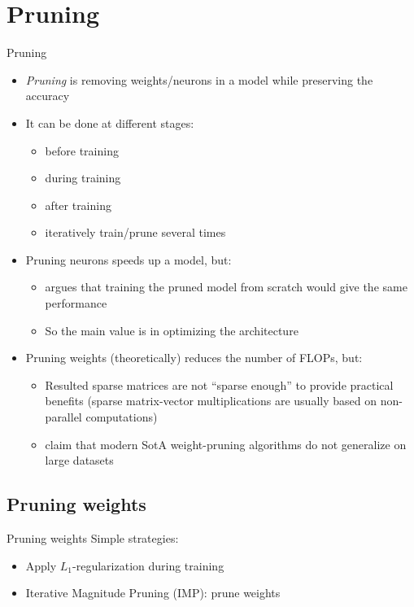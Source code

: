 \documentclass[10pt, handout]{beamer}
\begin{document}
\section{Pruning}
\begin{frame}{Pruning}
    \begin{itemize}
        \item\pause \textit{Pruning} is removing weights/neurons in a model while preserving the accuracy
        \item\pause It can be done at different stages:
        \begin{itemize}
            \item\pause before training
            \item\pause during training
            \item\pause after training
            \item\pause iteratively train/prune several times
        \end{itemize}
        \item\pause Pruning neurons speeds up a model, but:
        \begin{itemize}
            \item\pause \cite{Rethinking_Pruning} argues that training the pruned model from scratch would give the same performance
            \item\pause So the main value is in optimizing the architecture
        \end{itemize}
        \item\pause Pruning weights (theoretically) reduces the number of FLOPs, but:
        \begin{itemize}
            \item\pause Resulted sparse matrices are not ``sparse enough'' to provide practical benefits (sparse matrix-vector multiplications are usually based on non-parallel computations)
            \item\pause \cite{State_of_sparsity, Rethinking_Pruning} claim that modern SotA weight-pruning algorithms do  not generalize on large datasets
        \end{itemize}
    \end{itemize}
\end{frame}


\subsection{Pruning weights}
\begin{frame}{Pruning weights}
    \pause Simple strategies:
    \begin{itemize}
        \item Apply $L_1$-regularization during training
        \item Iterative Magnitude Pruning (IMP): prune weights
    \end{itemize}
\end{frame}
\end{document}
